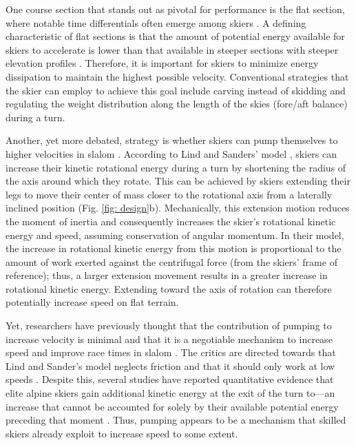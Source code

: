 \documentclass{article}
\begin{document}
One course section that stands out as pivotal for performance is the flat section\cite{supej_new_2011, supej_relations_2006}, where notable time differentials often emerge among skiers \cite{supej_impact_2015}. A defining characteristic of flat sections is that the amount of potential energy available for skiers to accelerate is lower than that available in steeper sections with steeper elevation profiles \cite{supej_differential_2008}. Therefore, it is important for skiers to minimize energy dissipation to maintain the highest possible velocity. Conventional strategies that the skier can employ to achieve this goal include carving instead of skidding and regulating the weight distribution along the length of the skies (fore/aft balance) during a turn\cite{reid_turn_2009, reid_kinematic_2010,supej_impact_2015, supej_differential_2008}.

Another, yet more debated, strategy is whether skiers can pump themselves to higher velocities in slalom \cite{lind_physics_2013, luginbuhl_identification_2023, mote_accelerations_1983}. According to Lind and Sanders' model \cite{lind_physics_2013}, skiers can increase their kinetic rotational energy during a turn by shortening the radius of the axis around which they rotate. This can be achieved by skiers extending their legs to move their center of mass closer to the rotational axis from a laterally inclined position (Fig. \ref{fig: design}b). Mechanically, this extension motion reduces the moment of inertia and consequently increases the skier's rotational kinetic energy and speed, assuming conservation of angular momentum. In their model, the increase in rotational kinetic energy from this motion is proportional to the amount of work exerted against the centrifugal force (from the skiers' frame of reference); thus, a larger extension movement results in a greater increase in rotational kinetic energy. Extending toward the axis of rotation can therefore potentially increase speed on flat terrain.

Yet, researchers have previously thought that the contribution of pumping to increase velocity is minimal and that it is a negotiable mechanism to increase speed and improve race times in slalom \cite{supej_differential_2008, supej_doba_2001}. The critics are directed towards that Lind and Sander's model neglects friction and that it should only work at low speeds \cite{supej_differential_2008, supej_how_2010}. Despite this, several studies have reported quantitative evidence that elite alpine skiers gain additional kinetic energy at the exit of the turn to—an increase that cannot be accounted for solely by their available potential energy preceding that moment \cite{reid_kinematic_2010, supej_differential_2008, supej_how_2010, supej_impact_2015}. Thus, pumping appears to be a mechanism that skilled skiers already exploit to increase speed to some extent. 
\end{document}

